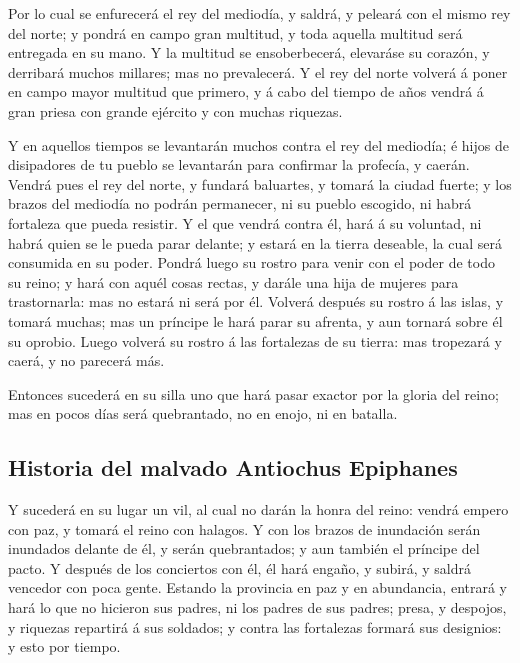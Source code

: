  Por lo cual se enfurecerá el rey del mediodía, y saldrá,
y peleará con el mismo rey del norte; y pondrá en campo gran multitud, y
toda aquella multitud será entregada en su mano.  Y la
multitud se ensoberbecerá, elevaráse su corazón, y derribará muchos
millares; mas no prevalecerá.  Y el rey del norte volverá
á poner en campo mayor multitud que primero, y á cabo del tiempo de años
vendrá á gran priesa con grande ejército y con muchas riquezas.

 Y en aquellos tiempos se levantarán muchos contra el rey
del mediodía; é hijos de disipadores de tu pueblo se levantarán para
confirmar la profecía, y caerán.  Vendrá pues el rey del
norte, y fundará baluartes, y tomará la ciudad fuerte; y los brazos del
mediodía no podrán permanecer, ni su pueblo escogido, ni habrá fortaleza
que pueda resistir.  Y el que vendrá contra él, hará á su
voluntad, ni habrá quien se le pueda parar delante; y estará en la
tierra deseable, la cual será consumida en su poder. 
Pondrá luego su rostro para venir con el poder de todo su reino; y hará
con aquél cosas rectas, y darále una hija de mujeres para trastornarla:
mas no estará ni será por él.  Volverá después su rostro
á las islas, y tomará muchas; mas un príncipe le hará parar su afrenta,
y aun tornará sobre él su oprobio.  Luego volverá su
rostro á las fortalezas de su tierra: mas tropezará y caerá, y no
parecerá más.

 Entonces sucederá en su silla uno que hará pasar exactor
por la gloria del reino; mas en pocos días será quebrantado, no en
enojo, ni en batalla.

\hypertarget{historia-del-malvado-antiochus-epiphanes}{%
\subsection{Historia del malvado Antiochus
Epiphanes}\label{historia-del-malvado-antiochus-epiphanes}}

 Y sucederá en su lugar un vil, al cual no darán la honra
del reino: vendrá empero con paz, y tomará el reino con halagos.
 Y con los brazos de inundación serán inundados delante
de él, y serán quebrantados; y aun también el príncipe del pacto.
 Y después de los conciertos con él, él hará engaño, y
subirá, y saldrá vencedor con poca gente.  Estando la
provincia en paz y en abundancia, entrará y hará lo que no hicieron sus
padres, ni los padres de sus padres; presa, y despojos, y riquezas
repartirá á sus soldados; y contra las fortalezas formará sus designios:
y esto por tiempo.

